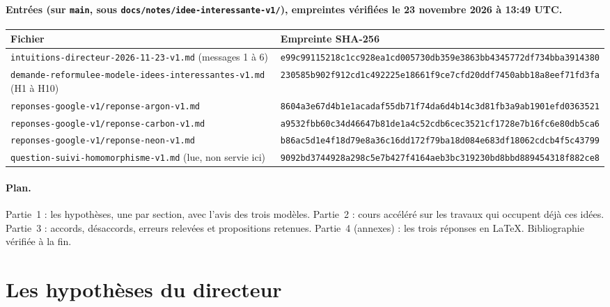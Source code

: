 \documentclass[a4paper,11pt]{article}
\begin{document}
\paragraph{Entrées (sur \texttt{main}, sous \texttt{docs/notes/idee-interessante-v1/}), empreintes vérifiées le 23 novembre 2026 à 13:49 UTC.}
{\small
\begin{longtable}{@{}p{7.2cm}p{9.2cm}@{}}
\toprule Fichier & Empreinte SHA-256\\ \midrule
\nolinkurl{intuitions-directeur-2026-11-23-v1.md} (messages 1 à 6) & \texttt{e99c99115218c1cc928ea1cd005730db\-359e3863bb4345772df734bba3914380}\\
\nolinkurl{demande-reformulee-modele-idees-interessantes-v1.md} (H1 à H10) & \texttt{230585b902f912cd1c492225e18661f9\-ce7cfd20ddf7450abb18a8eef71fd3fa}\\
\nolinkurl{reponses-google-v1/reponse-argon-v1.md} & \texttt{8604a3e67d4b1e1acadaf55db71f74da\-6d4b14c3d81fb3a9ab1901efd0363521}\\
\nolinkurl{reponses-google-v1/reponse-carbon-v1.md} & \texttt{a9532fbb60c34d46647b81de1a4c52cd\-b6cec3521cf1728e7b16fc6e80db5ca6}\\
\nolinkurl{reponses-google-v1/reponse-neon-v1.md} & \texttt{b86ac5d1e4f18d79e8a36c16dd172f79\-ba18d084e683df18062cdcb4f5c43799}\\
\nolinkurl{question-suivi-homomorphisme-v1.md} (lue, non servie ici) & \texttt{9092bd3744928a298c5e7b427f4164ae\-b3bc319230bd8bbd889454318f882ce8}\\
\bottomrule
\end{longtable}}

\paragraph{Plan.} Partie~1 : les hypothèses, une par section, avec l'avis des trois modèles. Partie~2 : cours accéléré sur les travaux qui occupent déjà ces idées. Partie~3 : accords, désaccords, erreurs relevées et propositions retenues. Partie~4 (annexes) : les trois réponses en \LaTeX{}. Bibliographie vérifiée à la fin.

\tableofcontents
\newpage

\section{Les hypothèses du directeur}
\end{document}
